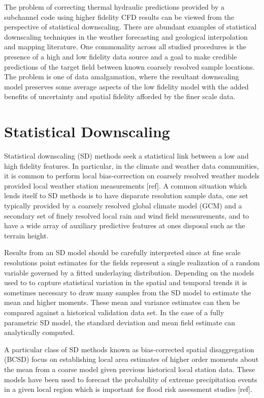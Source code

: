 
The problem of correcting thermal hydraulic predictions provided by a subchannel code using higher fidelity CFD results can be viewed from the perspective of statistical downscaling.  There are abundant examples of statistical downscaling techniques in the weather forecasting and geological interpolation and mapping literature.  One commonality across all studied procedures is the presence of a high and low fidelity data source and a goal to make credible predictions of the target field between known coarsely resolved sample locations.  The problem is one of data amalgamation, where the resultant downscaling model preserves some average aspects of the low fidelity model with the added benefits of uncertainty and spatial fidelity afforded by the finer scale data.

\section{Statistical Downscaling}

Statistical downscaling (SD) methods seek a statistical link between a low and high fidelity features. 
In particular, in the climate and weather data communities, it is common to perform local bias-correction on coarsely resolved weather models provided local weather station measurements [ref].    A common situation which lends itself to SD methods is to have disparate resolution sample data, one set typically provided by a coarsely resolved global climate model (GCM) and a secondary set of finely resolved local rain and wind field measurements, and to have a wide array of auxiliary predictive features at ones disposal such as the terrain height.


Results from an SD model should be carefully interpreted since at fine scale resolutions point estimates for the fields represent a single realization of a random variable governed by a fitted underlaying distribution.  Depending on the models used to to capture statistical variation in the spatial and temporal trends it is sometimes necessary to draw many samples from the SD model to estimate the mean and higher moments.  These mean and variance estimates can then be compared against a historical validation data set.  In the case of a fully parametric SD model, the standard deviation and mean field estimate can analytically computed.

A particular class of SD methods known as bias-corrected spatial disaggregation (BCSD) focus on establishing local area estimates of higher order moments about the mean from a coarse model given previous historical local station data.  These models have been used to forecast the probability of extreme precipitation events in a given local region which is important for flood risk assessment studies [ref].

